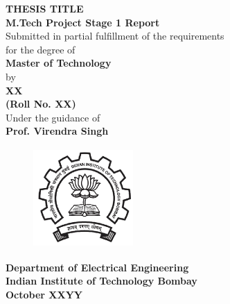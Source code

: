 \documentclass[a4paper,12pt, final]{report}
\begin{document}
  \thispagestyle{empty}
  \vspace*{1cm}
  {\centering     
  \textbf{\LARGE THESIS TITLE}\\
  \vspace{1.20cm}
  \textbf{\large M.Tech Project Stage 1 Report}\\
  \vspace{1cm}
  {Submitted in partial fulfillment of the requirements}\\
  \vspace{0.25cm}
  {for the degree of}\\
  \vspace{1cm}
  \textbf{ Master of Technology}\\
  \vspace{1.50cm}
  {by}\\
  \vspace{0.20cm}
  \textbf{\large XX}\\
  \vspace{0.25cm}
  \textbf{\large (Roll No. XX)}\\
  \vspace{1.8cm}
  {Under the guidance of}\\
  \vspace{0.20cm}
  \textbf{\large Prof. Virendra Singh}\\
    \vspace{0.30cm}
  \vspace{1.450cm}
    \begin{figure}[htb]
    \begin{center}
    \includegraphics[height=1.5in,width=1.5in]{iitblogo.png}
    \end{center}
    \end{figure}

    
  {\textbf{Department of Electrical Engineering}}\\
  {\textbf{Indian Institute of Technology Bombay}}\\
  {\textbf{October XXYY}}
 
 }
 
\renewcommand{\abstractname}{Acknowledgement}
\begin{abstract}
I express my gratitude to my guide Prof. Virendra Singh for providing me the opportunity to work on this topic. 
\\\\
\\\\
\\\\
XX\\
Electrical Engineering\\
IIT Bombay\\\

\end{abstract}
\end{document}

